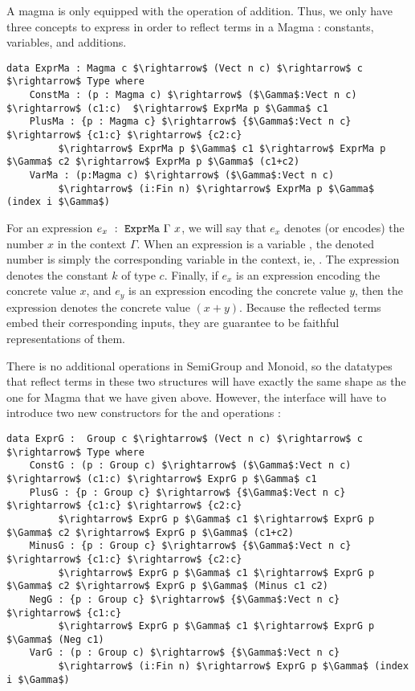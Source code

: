 A magma is only equipped with the operation of addition. Thus, we only have three concepts to express in order to reflect terms in a Magma : constants, variables, and additions.

\begin{lstlisting}
data ExprMa : Magma c $\rightarrow$ (Vect n c) $\rightarrow$ c $\rightarrow$ Type where
    ConstMa : (p : Magma c) $\rightarrow$ ($\Gamma$:Vect n c) $\rightarrow$ (c1:c)  $\rightarrow$ ExprMa p $\Gamma$ c1 
    PlusMa : {p : Magma c} $\rightarrow$ {$\Gamma$:Vect n c} $\rightarrow$ {c1:c} $\rightarrow$ {c2:c} 
         $\rightarrow$ ExprMa p $\Gamma$ c1 $\rightarrow$ ExprMa p $\Gamma$ c2 $\rightarrow$ ExprMa p $\Gamma$ (c1+c2) 
    VarMa : (p:Magma c) $\rightarrow$ ($\Gamma$:Vect n c)
         $\rightarrow$ (i:Fin n) $\rightarrow$ ExprMa p $\Gamma$ (index i $\Gamma$)
\end{lstlisting}


For an expression $e_x\ :\ \code{ExprMa}\ \Gamma\ x$, we will say that $e_x$ denotes (or encodes) the number $x$ in the context $\Gamma$.
When an expression is a variable , the denoted number is simply the corresponding variable in the context, ie, .
The expression  denotes the constant $k$ of type $c$. Finally, if $e_x$ is an expression encoding the concrete value $x$, and $e_y$ is an expression encoding the concrete value $y$, then the expression  denotes the concrete value $(x + y)$. Because the reflected terms embed their corresponding inputs, they are guarantee to be faithful representations of them.

There is no additional operations in SemiGroup and Monoid, so the datatypes that reflect terms in these two structures will have exactly the same shape as the one for Magma that we have given above.
However, the  interface will have to introduce two new constructors for the  and  operations :

\begin{lstlisting}
data ExprG :  Group c $\rightarrow$ (Vect n c) $\rightarrow$ c $\rightarrow$ Type where
    ConstG : (p : Group c) $\rightarrow$ ($\Gamma$:Vect n c) $\rightarrow$ (c1:c) $\rightarrow$ ExprG p $\Gamma$ c1
    PlusG : {p : Group c} $\rightarrow$ {$\Gamma$:Vect n c} $\rightarrow$ {c1:c} $\rightarrow$ {c2:c} 
         $\rightarrow$ ExprG p $\Gamma$ c1 $\rightarrow$ ExprG p $\Gamma$ c2 $\rightarrow$ ExprG p $\Gamma$ (c1+c2)
    MinusG : {p : Group c} $\rightarrow$ {$\Gamma$:Vect n c} $\rightarrow$ {c1:c} $\rightarrow$ {c2:c} 
         $\rightarrow$ ExprG p $\Gamma$ c1 $\rightarrow$ ExprG p $\Gamma$ c2 $\rightarrow$ ExprG p $\Gamma$ (Minus c1 c2)
    NegG : {p : Group c} $\rightarrow$ {$\Gamma$:Vect n c} $\rightarrow$ {c1:c} 
         $\rightarrow$ ExprG p $\Gamma$ c1 $\rightarrow$ ExprG p $\Gamma$ (Neg c1)
    VarG : (p : Group c) $\rightarrow$ {$\Gamma$:Vect n c} 
         $\rightarrow$ (i:Fin n) $\rightarrow$ ExprG p $\Gamma$ (index i $\Gamma$)
\end{lstlisting}


